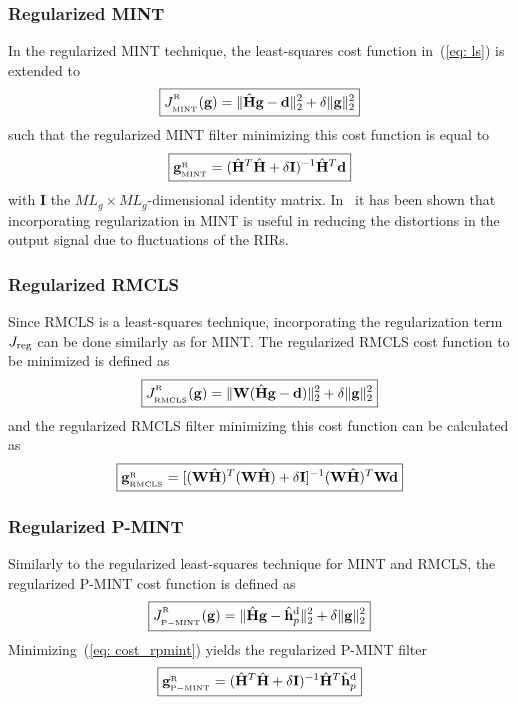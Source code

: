 \documentclass[draftcls,onecolumn,11pt]{IEEEtran}
\begin{document}
\subsubsection*{Regularized MINT~\cite{Hikichi_EURASIP_2007}}
In the regularized MINT technique, the least-squares cost function in~(\ref{eq: ls}) is extended to
\begin{equation}
\label{eq: cost_rmint}
\boxed{J_{{}_{\rm MINT}}^{^{_{\rm R}}}(\mathbf{g}) = \|\hat{\mathbf{H}}\mathbf{g} - \mathbf{d}\|_2^2 + \delta \|\mathbf{g} \|_2^2}
\end{equation}
such that the regularized MINT filter minimizing this cost function is equal to
\begin{equation}
\label{eq: rmint_sgol}
\boxed{\mathbf{g}_{{}_{\rm MINT}}^{{_{\rm R}}}  = (\hat{\mathbf{H}}^T\hat{\mathbf{H}}+\delta \mathbf{I})^{-1}\hat{\mathbf{H}}^{T}\mathbf{d}}
\end{equation}
with $\mathbf{I}$ the $ML_g\times ML_g$-dimensional identity matrix.
In~\cite{Hikichi_EURASIP_2007} it has been shown that incorporating regularization in MINT is useful in reducing the distortions in the output signal due to fluctuations of the RIRs.


\subsubsection*{Regularized RMCLS}
Since RMCLS is a least-squares technique, incorporating the regularization term $J_{\rm reg}$ can be done similarly as for MINT.
The regularized RMCLS cost function to be minimized is defined as
\begin{equation}
\label{eq: cost_rrmcls}
\boxed{J_{{}_{\rm RMCLS}}^{^{_{\rm R}}}(\mathbf{g}) =  \|\mathbf{W}({\hat{\mathbf{H}}}\mathbf{g} - \mathbf{d})\|_2^2 + \delta \|\mathbf{g} \|_2^2}
\end{equation}
and the regularized RMCLS filter minimizing this cost function can be calculated as
\begin{equation}
\boxed{\mathbf{g}_{{}_{\rm RMCLS}}^{{_{\rm R}}}  = [(\mathbf{W}\hat{\mathbf{H}})^T(\mathbf{W}\hat{\mathbf{H}}) + \delta \mathbf{I}]^{-1} (\mathbf{W}\hat{\mathbf{H}})^T \mathbf{W}\mathbf{d}}
\end{equation}

\subsubsection*{Regularized P-MINT}
Similarly to the regularized least-squares technique for MINT and RMCLS, the regularized P-MINT cost function is defined as
\begin{equation}
\label{eq: cost_rpmint}
\boxed{J_{{}_{\rm P-MINT}} ^{^{_{\rm R}}}(\mathbf{g}) = \|\hat{\mathbf{H}}\mathbf{g} - \hat{\mathbf{h}}_p^{\rm d}\|_2^2 + \delta \|\mathbf{g} \|_2^2}
\end{equation}
Minimizing~(\ref{eq: cost_rpmint}) yields the regularized P-MINT filter
\begin{equation}
\label{eq: rpmintsol}
\boxed{\mathbf{g}_{{}_{\rm P-MINT}}^{{_{\rm R}}}  = (\hat{\mathbf{H}}^T\hat{\mathbf{H}}+\delta \mathbf{I})^{-1}\hat{\mathbf{H}}^{T}\hat{\mathbf{h}}_p^{\rm d}}
\end{equation}
\end{document}
